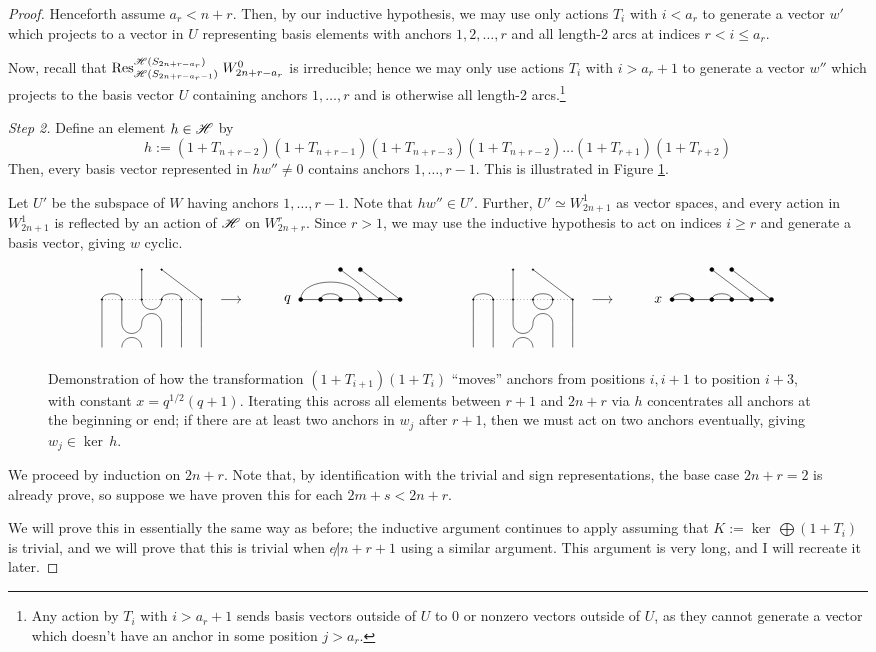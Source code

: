 \documentclass{amsart}
\begin{document}
\begin{proof}
  Henceforth assume $a_r < n + r$.
  Then, by our inductive hypothesis, we may use only actions $T_i$ with $i < a_r$ to generate a vector $w'$ which projects to a vector in $U$ representing basis elements with anchors $1,2,\dots,r$ and all length-2 arcs at indices $r < i \leq a_r$. 

  Now, recall that $\text{Res}_{\mathscr{H}(S_{2n + r - a_r-1})}^{\mathscr{H}(S_{2n + r - a_r})} \; W_{2n + r - a_r}^0$ is irreducible;
  hence we may only use actions $T_i$ with $i > a_r+1$ to generate a vector $w''$ which projects to the basis vector $U$ containing anchors $1,\dots,r$ and is otherwise all length-2 arcs.\footnote{Any action by $T_i$ with $i > a_r + 1$ sends basis vectors outside of $U$ to 0 or nonzero vectors outside of $U$, as they cannot generate a vector which doesn't have an anchor in some position $j > a_r$.}

  \vspace{\sectionsep}
  \textit{Step 2.}
  Define an element $h \in \mathscr{H}$ by
  \[
    h := (1 + T_{n + r - 2})(1 + T_{n+r-1})(1 + T_{n+r-3})(1 + T_{n+r-2})\dots(1 + T_{r+1})(1 + T_{r+2})
  \]
  Then, every basis vector represented in $hw'' \neq 0$ contains anchors $1,\dots,r-1$.
  This is illustrated in Figure \ref{h}.

  Let $U'$ be the subspace of $W$ having anchors $1,\dots,r-1$.
  Note that $hw'' \in U'$.
  Further, $U' \simeq W_{2n + 1}^1$ as vector spaces, and every action in $W_{2n + 1}^1$ is reflected by an action of $\mathscr{H}$ on $W_{2n + r}^r$.
  Since $r > 1$, we may use the inductive hypothesis to act on indices $i \geq r$ and generate a basis vector, giving $w$ cyclic.
    
  \begin{figure}
    \[
      \GeneralizedNAction{6}{1/2,4/5}{2}{3/1, 6/2}{3/4}{3/1, 2/2}{1/4, 2/3}{5/1, 6/2}{q}
      \hspace{50pt}
      \GeneralizedNAction{6}{1/2,4/5}{2}{3/1, 6/2}{3/4}{4/1, 3/2}{1/2, 3/4}{5/1, 6/2}{x}
    \]
  \caption{
    Demonstration of how the transformation $(1 + T_{i+1})(1 + T_i)$ ``moves'' anchors from positions $i,i+1$ to position $i+3$, with constant $x = q^{1/2}(q+1)$.
    Iterating this across all elements between $r+1$ and $2n + r$ via $h$ concentrates all anchors at the beginning or end; 
    if there are at least two anchors in $w_j$ after $r+1$, then we must act on two anchors eventually, giving $w_j \in \ker \, h$.
  }\label{h}
\end{figure}
  \fi
  We proceed by induction on $2n + r$.
  Note that, by identification with the trivial and sign representations, the base case $2n + r = 2$ is already prove, so suppose we have proven this for each $2m + s < 2n + r$.

  We will prove this in essentially the same way as before;
  the inductive argument continues to apply assuming that $K := \ker \, \bigoplus(1 + T_i)$ is trivial, and we will prove that this is trivial when $e \not| n + r + 1$ using a similar argument.
  This argument is very long, and I will recreate it later.
\end{proof}
\end{document}
